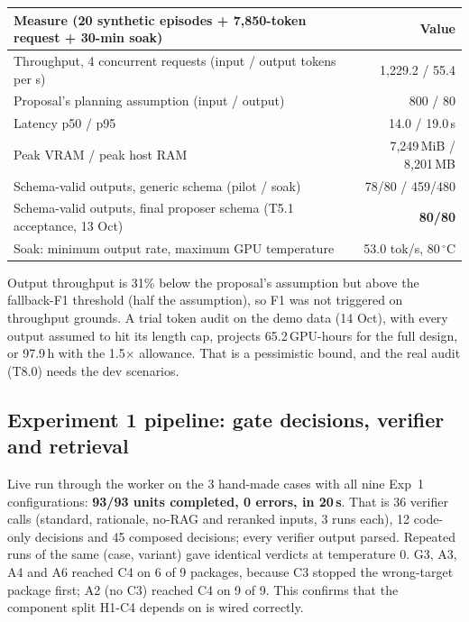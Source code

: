 \documentclass[11pt,a4paper]{article}
\begin{document}
{\small
\begin{tabularx}{\linewidth}{@{}Lr@{}}
\toprule
\textbf{Measure (20 synthetic episodes + 7,850-token request + 30-min soak)} & \textbf{Value}\\
\midrule
Throughput, 4 concurrent requests (input / output tokens per s) & 1,229.2 / 55.4 \\
Proposal's planning assumption (input / output) & 800 / 80 \\
Latency p50 / p95 & 14.0 / 19.0\,s \\
Peak VRAM / peak host RAM & 7,249\,MiB / 8,201\,MB \\
Schema-valid outputs, generic schema (pilot / soak) & 78/80 / 459/480 \\
Schema-valid outputs, final proposer schema (T5.1 acceptance, 13 Oct) & \textbf{80/80} \\
Soak: minimum output rate, maximum GPU temperature & 53.0 tok/s, 80\,$^\circ$C \\
\bottomrule
\end{tabularx}}
Output throughput is 31\% below the proposal's assumption but above the fallback-F1 threshold (half the assumption), so F1 was not triggered on throughput grounds. A trial token audit on the demo data (14 Oct), with every output assumed to hit its length cap, projects 65.2\,GPU-hours for the full design, or 97.9\,h with the 1.5$\times$ allowance. That is a pessimistic bound, and the real audit (T8.0) needs the dev scenarios.

\subsection{Experiment 1 pipeline: gate decisions, verifier and retrieval}
Live run through the worker on the 3 hand-made cases with all nine Exp~1 configurations: \textbf{93/93 units completed, 0 errors, in 20\,s}. That is 36 verifier calls (standard, rationale, no-RAG and reranked inputs, 3 runs each), 12 code-only decisions and 45 composed decisions; every verifier output parsed. Repeated runs of the same (case, variant) gave identical verdicts at temperature 0. G3, A3, A4 and A6 reached C4 on 6 of 9 packages, because C3 stopped the wrong-target package first; A2 (no C3) reached C4 on 9 of 9. This confirms that the component split H1-C4 depends on is wired correctly.
\end{document}
